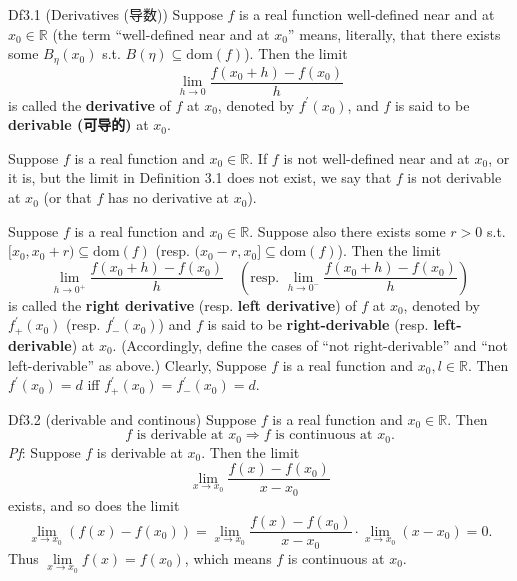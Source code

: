 \documentclass{article}
\begin{document}
\begin{Df}{Df3.1 (Derivatives (导数))}
    Suppose $f$ is a real function well-defined near and at $x_0\in\mathbb{R}$ (the term ``well-defined near and at $x_0$'' means, literally, that there exists some $B_\eta(x_0)$ s.t. $B(\eta)\subseteq \text{dom}(f)$). Then the limit
    $$ \lim_{h\to 0} \frac{f(x_0+h)-f(x_0)}{h} $$
    is called the \textbf{derivative} of $f$ at $x_0$, denoted by $f^\prime(x_0)$, and $f$ is said to be \textbf{derivable (可导的)} at $x_0$. 
\end{Df}

\begin{Rmk}{}
    \begin{compactenum}
        \item \textcolor{Df}{Suppose $f$ is a real function and $x_0\in\mathbb{R}$. If $f$ is not well-defined near and at $x_0$, or it is, but the limit in Definition 3.1 does not exist, we say that $f$ is not derivable at $x_0$ (or that $f$ has no derivative at $x_0$).}
        \item \textcolor{Df}{Suppose $f$ is a real function and $x_0\in\mathbb{R}$. Suppose also there exists some $r>0$ s.t. $[x_0, x_0+r)\subseteq \text{dom}(f)$ (resp. $(x_0-r, x_0]\subseteq \text{dom}(f)$). Then the limit 
        $$ \lim_{h\to 0^+} \frac{f(x_0+h)-f(x_0)}{h}\quad \left(\text{resp. } \lim_{h\to 0^-} \frac{f(x_0+h)-f(x_0)}{h}\right) $$
        is called the \textbf{right derivative} (resp. \textbf{left derivative}) of $f$ at $x_0$, denoted by $f_+^\prime (x_0)$ (resp. $f_-^\prime (x_0)$) and $f$ is said to be \textbf{right-derivable} (resp. \textbf{left-derivable}) at $x_0$. (Accordingly, define the cases of ``not right-derivable'' and ``not left-derivable'' as above.)} Clearly, \textcolor{Th}{Suppose $f$ is a real function and $x_0, l\in\mathbb{R}$. Then $f^\prime(x_0) = d$ iff $f_+^\prime(x_0) = f_-^\prime(x_0) = d$.}
    \end{compactenum}
\end{Rmk}

\begin{Th}{Df3.2 (derivable and continous)}
    Suppose $f$ is a real function and $x_0\in\mathbb{R}$. Then 
    $$ f \text{ is derivable at } x_0 \Rightarrow f \text{ is continuous at } x_0. $$
    \tcblower
    \textit{Pf}: Suppose $f$ is derivable at $x_0$. Then the limit
    $$ \lim_{x\to x_0} \frac{f(x)-f(x_0)}{x-x_0} $$
    exists, and so does the limit 
    $$\lim\limits_{x\to x_0} (f(x)-f(x_0)) = \lim\limits_{x\to x_0} \frac{f(x)-f(x_0)}{x-x_0}\cdot \lim\limits_{x\to x_0} (x-x_0) = 0.$$ 
    Thus $\lim\limits_{x\to x_0} f(x) = f(x_0)$, which means $f$ is continuous at $x_0$. 
\end{Th}
\end{document}
